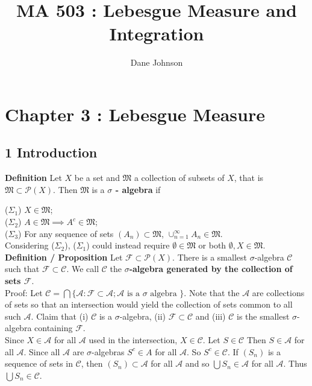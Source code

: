 \documentclass[a4paper]{article}
\title{MA 503 : Lebesgue Measure and Integration}
\author{Dane Johnson}
\begin{document}
\maketitle

\section*{Chapter 3 : Lebesgue Measure}

\subsection*{1 Introduction}

{\bf Definition} Let $X$ be a set and $\mathfrak{M}$ a collection of subsets of $X$, that is $\mathfrak{M} \subset \mathcal{P}(X)$. Then $\mathfrak{M}$ is a {\bf $\sigma$ - algebra} if

($\Sigma_1$) $X \in \mathfrak{M}$;\\
($\Sigma_2$) $A \in \mathfrak{M} \implies A^c \in \mathfrak{M}$;\\
($\Sigma_3$) For any sequence of sets $(A_n)\subset \mathfrak{M}$, $\cup_{n=1}^\infty A_n \in \mathfrak{M}$.\\

Considering ($\Sigma_2$), ($\Sigma_1$) could instead require $\emptyset \in \mathfrak{M}$ or both $\emptyset, X \in \mathfrak{M}$. \\

{\bf Definition / Proposition} Let $\mathcal{F} \subset \mathcal{P}(X)$. There is a smallest $\sigma$-algebra $\mathcal{C}$ such that $\mathcal{F} \subset \mathcal{C}$. We call $\mathcal{C}$ the {\bf $\sigma$-algebra generated by the collection of sets $\mathcal{F}$}. \\

Proof: Let $\mathcal{C} = \bigcap\{\mathcal{A} : \mathcal{F}\subset \mathcal{A}; \mathcal{A} \text{ is a } \sigma \text{ algebra }\}$. Note that the $\mathcal{A}$ are collections of sets so that an intersection would yield the collection of sets common to all such $\mathcal{A}$.  Claim that (i) $\mathcal{C}$ is a $\sigma$-algebra, (ii) $\mathcal{F}\subset \mathcal{C}$ and (iii) $\mathcal{C}$ is the smallest $\sigma$-algebra containing $\mathcal{F}$.\\

Since $X \in \mathcal{A}$ for all $\mathcal{A}$ used in the intersection, $X \in \mathcal{C}$. Let $S \in \mathcal{C}$ Then $S \in \mathcal{A}$ for all $\mathcal{A}$. Since all $\mathcal{A}$ are $\sigma$-algebras $S^c \in A$ for all $\mathcal{A}$. So $S^c \in \mathcal{C}$. If $(S_n)$ is a sequence of sets in $\mathcal{C}$, then $(S_n)\subset \mathcal{A}$ for all $\mathcal{A}$ and so $\bigcup S_n \in \mathcal{A}$ for all $\mathcal{A}$. Thus $\bigcup S_n \in \mathcal{C}$.\\
\end{document}
